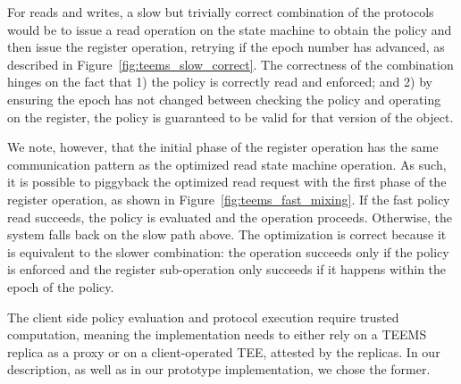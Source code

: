For reads and writes, a slow but trivially correct combination of
the protocols would be to issue a read operation on the state
machine to obtain the policy and then issue the register
operation, retrying if the epoch number has advanced, as described in Figure~\ref{fig:teems_slow_correct}.
The correctness of the combination hinges on the fact that 1) the
policy is correctly read and enforced; and 2) by ensuring the epoch
has not changed between checking the policy and operating on the
register, the policy is guaranteed to be valid for that version of the
object.


We note, however, that the initial phase of the register operation has
the same communication pattern as the optimized read state machine
operation. As such, it is possible to piggyback the optimized read
request with the first phase of the register operation, as shown in
Figure~\ref{fig:teems_fast_mixing}. If the fast policy read succeeds,
the policy is evaluated and the operation proceeds.  Otherwise, the
system falls back on the slow path above. The optimization is correct
because it is equivalent to the slower combination: the operation
succeeds only if the policy is enforced and the register sub-operation
only succeeds if it happens within the epoch of the policy.

The client side policy evaluation and protocol execution require
trusted computation, meaning the implementation needs to either
rely on a \ac{TEEMS} replica as a proxy or on a client-operated \ac{TEE},
attested by the replicas. In our description, as well as in our
prototype implementation, we chose the former.

%
